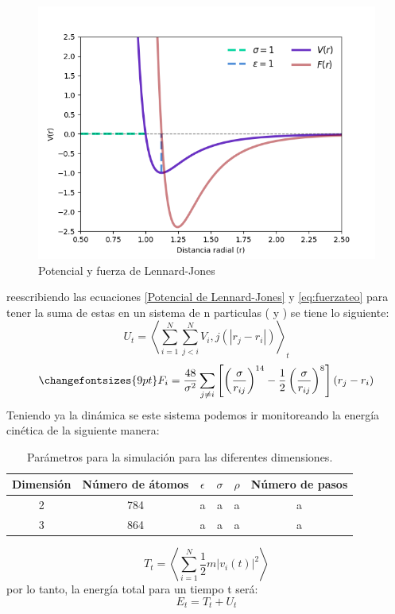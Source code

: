 \documentclass[reprint,amsmath,amssymb,aps,]{revtex4-2}
\begin{document}
\begin{figure}[H]
    \centering
    \includegraphics[scale=0.45]{../Graphics/Potencial.png}
    \caption{Potencial y fuerza de Lennard-Jones}
    \label{pot-len-jones}
\end{figure}
reescribiendo las ecuaciones \ref{Potencial de Lennard-Jones} y \ref{eq:fuerzateo} para tener la suma de estas en un sistema de n particulas (\cite{Nose1991} y \cite{Lee2005}) se tiene lo siguiente:
\begin{equation}
    \label{eq:pot-n}
    U_t=\left\langle\sum_{i=1}^N \sum_{j<i}^N V_i,j(|r_j-r_i|)\right\rangle_t
\end{equation}
\begin{equation}
    \changefontsizes{9pt}
    \label{eq:f-n}
    F_i = \frac{48}{\sigma^2} \sum_{j \ne i} \left[\left(\frac{\sigma}{r_{ij}}\right)^{14}-\frac{1}{2}\left(\frac{\sigma}{r_{ij}} \right)^8  \right] (r_j-r_i)
\end{equation}
Teniendo ya la dinámica se este sistema podemos ir monitoreando la energía cinética de la siguiente manera:
\begin{table}
    \begin{tabular}{cccccc}
        \hline
        Dimensión & Número de átomos & $\epsilon$ & $\sigma $ & $\rho $ & Número de pasos \\ \hline
        2 &784 &a &a &a &a \\
        3 &864 &a &a &a &a \\ \hline
    \end{tabular}
    \caption{Parámetros para la simulación para las diferentes dimensiones.}
    \label{table:parametros}
\end{table}
\begin{equation}
    \label{eq:kin-n}
    T_t=\left\langle \sum_{i=1}^N \frac{1}{2}m|v_i(t)|^2\right\rangle
\end{equation}
por lo tanto, la energía total para un tiempo t será:
\begin{equation}
    \label{eq:e-tot}
    E_t=T_t+U_t
\end{equation}
\end{document}
